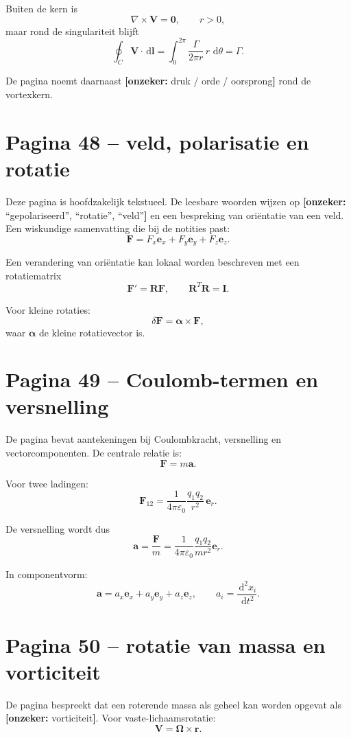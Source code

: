 \documentclass[11pt,a4paper]{article}
\newcommand{\onzeker}[1]{\ifmmode\text{\color{red!70!black}\bfseries[onzeker]}\else\textcolor{red!70!black}{\textbf{[onzeker:} #1\textbf{]}}\fi}
\newcommand{\dd}{\,\mathrm{d}}
\newcommand{\curl}{\nabla\times}
\newcommand{\V}{\mathbf{V}}
\newcommand{\Omegav}{\bm{\Omega}}
\begin{document}
Buiten de kern is
$$
\curl \V = \mathbf{0},
\qquad r>0,
$$
maar rond de singulariteit blijft
$$
\oint_C \V\cdot \dd\mathbf{l}
=
\int_0^{2\pi}
\frac{\Gamma}{2\pi r}\,r\,\dd\theta
=
\Gamma.
$$

De pagina noemt daarnaast \onzeker{druk / orde / oorsprong} rond de vortexkern.

\section*{Pagina 48 -- veld, polarisatie en rotatie}

Deze pagina is hoofdzakelijk tekstueel. De leesbare woorden wijzen op \onzeker{``gepolariseerd'', ``rotatie'', ``veld''} en een bespreking van oriëntatie van een veld. Een wiskundige samenvatting die bij de notities past:
$$
\mathbf{F}
=
F_x\mathbf{e}_x
+
F_y\mathbf{e}_y
+
F_z\mathbf{e}_z.
$$

Een verandering van oriëntatie kan lokaal worden beschreven met een rotatiematrix
$$
\mathbf{F}' = \mathbf{R}\mathbf{F},
\qquad
\mathbf{R}^{T}\mathbf{R}=\mathbf{I}.
$$

Voor kleine rotaties:
$$
\delta \mathbf{F}
=
\bm{\alpha}\times \mathbf{F},
$$
waar $\bm{\alpha}$ de kleine rotatievector is.

\section*{Pagina 49 -- Coulomb-termen en versnelling}

De pagina bevat aantekeningen bij Coulombkracht, versnelling en vectorcomponenten. De centrale relatie is:
$$
\mathbf{F}
=
m\mathbf{a}.
$$

Voor twee ladingen:
$$
\mathbf{F}_{12}
=
\frac{1}{4\pi\varepsilon_0}
\frac{q_1 q_2}{r^2}\,\mathbf{e}_r.
$$

De versnelling wordt dus
$$
\mathbf{a}
=
\frac{\mathbf{F}}{m}
=
\frac{1}{4\pi\varepsilon_0}
\frac{q_1q_2}{m r^2}\mathbf{e}_r.
$$

In componentvorm:
$$
\mathbf{a}
=
a_x\mathbf{e}_x+a_y\mathbf{e}_y+a_z\mathbf{e}_z,
\qquad
a_i = \frac{\dd^2 x_i}{\dd t^2}.
$$

\section*{Pagina 50 -- rotatie van massa en vorticiteit}

De pagina bespreekt dat een roterende massa als geheel kan worden opgevat als \onzeker{vorticiteit}. Voor vaste-lichaamsrotatie:
$$
\V = \Omegav\times\mathbf{r}.
$$
\end{document}
